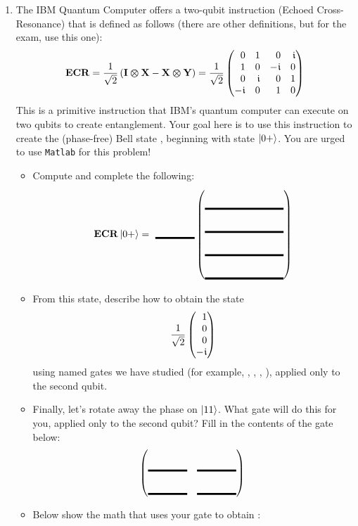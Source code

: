 \documentclass[12pt]{article}
\def\TwoQBlank{%
\DQB{\Blank[8em]}{\Blank[8em]}{\Blank[8em]}{\Blank[8em]}%
}
\def\TwoU{%
\SQBG{\relax}{\Blank[4em]{}}{\Blank[4em]{}}{\Blank[4em]{}}{\Blank[4em]{}}}
\begin{document}
\begin{enumerate}
\item{} The IBM Quantum Computer offers a two-qubit instruction \href{https://docs.quantum.ibm.com/api/qiskit/qiskit.circuit.library.ECRGate}{} (Echoed Cross-Resonance) that is defined as follows (there are other definitions, but for the exam, use this one):
\[
\NamedGate{ECR} = \RootTwo\left({\TensProd{\Identity}{\PauliX} - \TensProd{\PauliX}{\PauliY}}\right) = \RootTwo{}\begin{pmatrix*}[r]
0 & 1 & 0 & \NiceI{} \\
1 & 0 & -\NiceI{} & 0 \\
0 & \NiceI{} & 0 & 1 \\
-\NiceI{} & 0 & 1 & 0
\end{pmatrix*}
\]
This is a primitive instruction that IBM's quantum computer can execute on two qubits to create entanglement.  Your goal here is to use this instruction to create the (phase-free) Bell state , beginning with state $\ket{0+}$.  You are urged to use \texttt{Matlab} for this problem!
\begin{itemize}
    \item Compute and complete the following:
    \[ \NamedGate{ECR} \ket{0+} = \ \Blank[4em]{}\TwoQBlank \]
    \item From this state, describe how to obtain the state \[
    \RootTwo{}\DQB{1}{0}{0}{-\NiceI}
    \]
    using named gates we have studied (for example, \Hadamard{}, \PauliX{}, \PauliZ{}, \PauliY{}), applied only to the second qubit.
    \LeaveSpace{}
    \item Finally, let's rotate away the phase on $\ket{11}$.  What gate will do this for you, applied only to the second qubit?  Fill in the contents of the gate below:
    \[ \TwoU{} \]
    \LeaveSpace{}
    \item Below show the math that uses your gate to obtain :
    \LeaveSpace{}
\end{itemize}

\end{enumerate}
\end{document}
